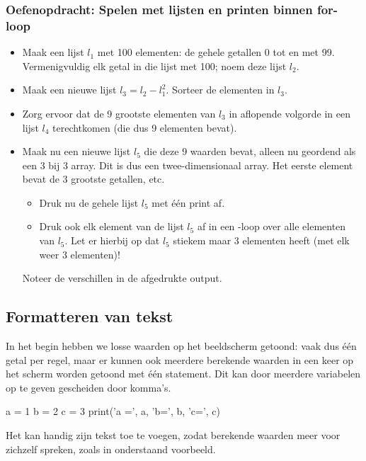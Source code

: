 \documentclass[a4paper,11pt, fleqn]{article}
\begin{document}
\subsubsection*{Oefenopdracht: Spelen met lijsten en printen binnen for-loop} 

\begin{itemize}
\item Maak een  lijst $l_1$ met 100 elementen: de gehele getallen 0 tot en met 99.
Vermenigvuldig elk getal in die lijst met 100; noem deze lijst $l_2$.
\item Maak een nieuwe lijst $ l_3 = l_2 - l_1^2$.
Sorteer de elementen in $l_3$. 
\item Zorg ervoor dat de 9 grootste elementen van $l_3$ in aflopende volgorde in een lijst $l_4$ terechtkomen (die dus 9 elementen bevat).
\item Maak nu een nieuwe lijst $l_5$ die deze 9 waarden bevat, alleen nu geordend als een 3 bij 3 array. Dit is dus een twee-dimensionaal array. Het eerste element bevat de 3 grootste getallen, etc.
 \begin{itemize}
  \item Druk nu de gehele lijst $l_5$ met \'e\'en print af. 
  \item Druk ook elk element van de lijst $l_5$ af in een -loop over alle elementen van $l_5$. Let er hierbij op dat $l_5$ stiekem maar 3 elementen heeft (met elk weer 3 elementen)! 
 \end{itemize}
 Noteer de verschillen in de afgedrukte output. 
\end{itemize}
\fi

\subsection{Formatteren van tekst}
\label{sec:format}

In het begin hebben we losse waarden op het beeldscherm getoond: vaak dus \'e\'en getal per regel, maar er kunnen ook meerdere berekende waarden in een keer op het scherm worden getoond met \'e\'en  statement. Dit kan door meerdere variabelen op te geven gescheiden door komma's.

\begin{python}
a = 1
b = 2
c = 3
print('a =', a, 'b=', b, 'c=', c)
\end{python}

Het kan handig zijn tekst toe te voegen, zodat berekende waarden meer voor zichzelf spreken, zoals in onderstaand voorbeeld.
\end{document}

